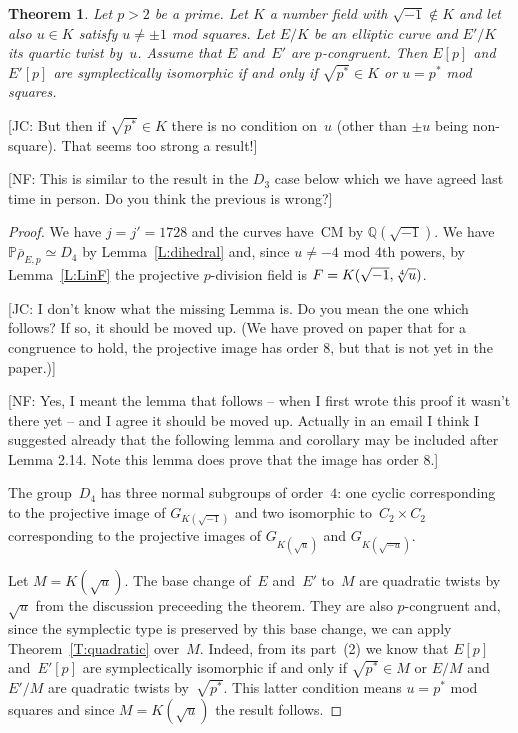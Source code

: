 \documentclass[12pt, reqno]{amsart}
\newcommand{\PP}{\mathbb{P}}
\newcommand{\Q}{\mathbb{Q}}
\newcommand{\rhobar}{{\overline{\rho}}}
\numberwithin{equation}{section}
\newtheorem{theorem}{Theorem}[section]
\theoremstyle{definition}
\theoremstyle{remark}
\newcommand{\nf}[1]{{\color{blue} \textsf{[NF: #1]}}}
\newcommand{\jc}[1]{{\color{darkgreen} \textsf{[JC: #1]}}}
\begin{document}
\begin{theorem}\label{T:quarticM} 
Let $p > 2$ be a prime. Let $K$ a number field with $\sqrt{-1} \not\in K$ and let also $u \in K$ satisfy $u \neq \pm 1$ mod squares. 
Let $E/K$ be an elliptic curve and $E'/K$
its quartic twist by~$u$.
Assume that $E$ and~$E'$ are $p$-congruent.
Then $E[p]$ and~$E'[p]$ are symplectically isomorphic if and only if
$\sqrt{p^*} \in K$ or $u = p^*$ mod squares.
\end{theorem}

\jc{But then if $\sqrt{p^*}\in K$ there is no condition on~$u$ (other
  than $\pm u$ being non-square).  That seems too strong a result!}

\nf{This is similar to the result in the $D_3$ case below which we have agreed last time in person. Do you think the previous is wrong?}
  
\begin{proof} 
We have $j=j'=1728$ and the curves have~CM by $\Q(\sqrt{-1})$. We have
$\PP \rhobar_{E,p} \simeq D_4$ by Lemma~\ref{L:dihedral} and, since $u \neq -4$ mod
4th powers, by Lemma~\ref{L:LinF} the projective $p$-division field is
$F = K(\sqrt{-1},\root 4 \of u)$.

\jc{I don't know what the missing Lemma is.  Do you mean the one which
  follows?  If so, it should be moved up.  (We have proved on paper
  that for a congruence to hold, the projective image has order 8, but
  that is not yet in the paper.)}

\nf{Yes, I meant the lemma that follows -- when I first wrote this proof it wasn't there yet -- and I agree it should be moved up. Actually in an email I think I suggested already that the following lemma and corollary may be included after Lemma 2.14. Note this lemma does prove that the image has order 8.}
  
The group~$D_4$ has three normal subgroups of order~$4$: one cyclic corresponding to the projective image of $G_{K(\sqrt{-1})}$ and two isomorphic to~$C_2 \times C_2$ corresponding to the projective images of
$G_{K(\sqrt{u})}$ and $G_{K(\sqrt{-u})}$.

Let $M = K(\sqrt{u})$. 
The base change of~$E$ and~$E'$  
to~$M$ are quadratic twists by~$\sqrt{u}$ from the discussion preceeding the theorem. They are also $p$-congruent and,  since the 
symplectic type is preserved by this base change, we can apply Theorem~\ref{T:quadratic} over~$M$.  
Indeed, from its part~(2) we know that
$E[p]$ and~$E'[p]$ are symplectically isomorphic if and only if $\sqrt{p^*} \in M$ 
or $E/M$ and $E'/M$ are quadratic twists by~$\sqrt{p^*}$. 
This latter condition means $u = p^*$ mod squares and since $M = K(\sqrt{u})$ the result follows.
\end{proof}
\end{document}
